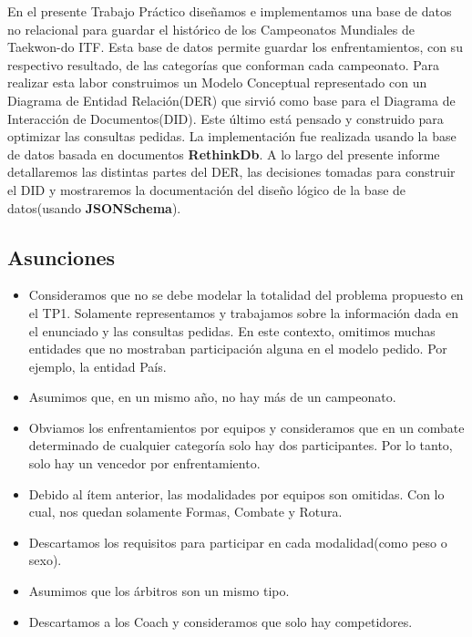 En el presente Trabajo Práctico diseñamos e implementamos una base de datos no relacional para guardar el histórico de los
Campeonatos Mundiales de Taekwon-do ITF. Esta base de datos permite guardar los enfrentamientos, con su respectivo
resultado, de las categorías que conforman cada campeonato. Para realizar esta labor construimos un Modelo Conceptual representado con un
Diagrama de Entidad Relación(DER) que sirvió como base para el Diagrama de Interacción de Documentos(DID). Este último está
pensado y construido para optimizar las consultas pedidas. La implementación fue realizada usando la base de datos basada
en documentos \textbf{RethinkDb}. A lo largo del presente informe detallaremos las distintas partes del DER, las decisiones
tomadas para construir el DID y mostraremos la documentación del diseño lógico de la base de datos(usando \textbf{JSONSchema}).

\subsection{Asunciones}
\begin{itemize}
\item Consideramos que no se debe modelar la totalidad del problema propuesto en el TP1. Solamente representamos y trabajamos
sobre la información dada en el enunciado y las consultas pedidas. En este contexto, omitimos muchas entidades que no mostraban
participación alguna en el modelo pedido. Por ejemplo, la entidad País.
\item Asumimos que, en un mismo año, no hay más de un campeonato.
\item Obviamos los enfrentamientos por equipos y consideramos que en un combate determinado de cualquier categoría solo hay
dos participantes. Por lo tanto, solo hay un vencedor por enfrentamiento.
\item Debido al ítem anterior, las modalidades por equipos son omitidas. Con lo cual, nos quedan solamente Formas, Combate y
Rotura.
\item Descartamos los requisitos para participar en cada modalidad(como peso o sexo).
\item Asumimos que los árbitros son un mismo tipo.
\item Descartamos a los Coach y consideramos que solo hay competidores.
\end{itemize}
